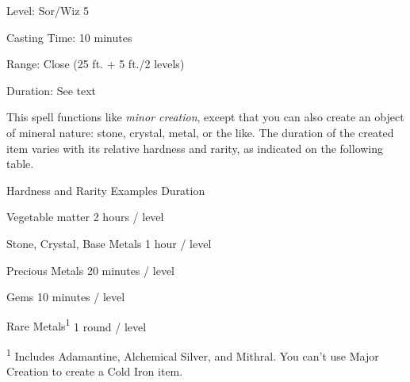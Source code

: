 
\begin{description*}
\item[Level:] Sor/Wiz 5
\item[Casting Time:] 10 minutes
\item[Range:] Close (25 ft. + 5 ft./2 levels)
\item[Duration:] See text
\end{description*}

This spell functions like \textit{minor creation}, except that you can also create
an object of mineral nature: stone, crystal, metal, or the like. The duration of
the created item varies with its relative hardness and rarity, as indicated on
the following table.
\begin{description*}
\item[Hardness and Rarity Examples] Duration
\item[Vegetable matter] 2 hours / level
\item[Stone, Crystal, Base Metals] 1 hour / level
\item[Precious Metals] 20 minutes / level
\item[Gems] 10 minutes / level
\item[Rare Metals\textsuperscript{1}] 1 round / level
\end{description*}
\textsuperscript{1} Includes Adamantine, Alchemical Silver, and Mithral. You can't use Major Creation to create a Cold Iron item.
